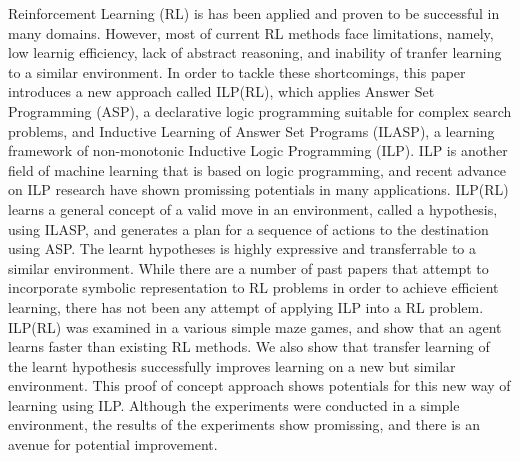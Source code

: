 Reinforcement Learning (RL) is has been applied and proven to be successful in many domains.
However, most of current RL methods face limitations, namely, low learnig efficiency, lack of abstract reasoning, and inability of tranfer learning to a similar environment.
In order to tackle these shortcomings, this paper introduces a new approach called ILP(RL), 
which applies Answer Set Programming (ASP), a declarative logic programming suitable for complex search problems, 
and Inductive Learning of Answer Set Programs (ILASP), a learning framework of non-monotonic Inductive Logic Programming (ILP).
ILP is another field of machine learning that is based on logic programming, and recent advance on ILP research have shown promissing potentials in many applications.
ILP(RL) learns a general concept of a valid move in an environment, called a hypothesis, using ILASP, and generates a plan for a sequence of actions to the destination using ASP.
The learnt hypotheses is highly expressive and transferrable to a similar environment. 
While there are a number of past papers that attempt to incorporate symbolic representation to RL problems in order to achieve efficient learning, 
there has not been any attempt of applying ILP into a RL problem.
ILP(RL) was examined in a various simple maze games, and show that an agent learns faster than existing RL methods.
We also show that transfer learning of the learnt hypothesis successfully improves learning on a new but similar environment.
This proof of concept approach shows potentials for this new way of learning using ILP.
Although the experiments were conducted in a simple environment, the results of the experiments show promissing, and there is an avenue for potential improvement.
